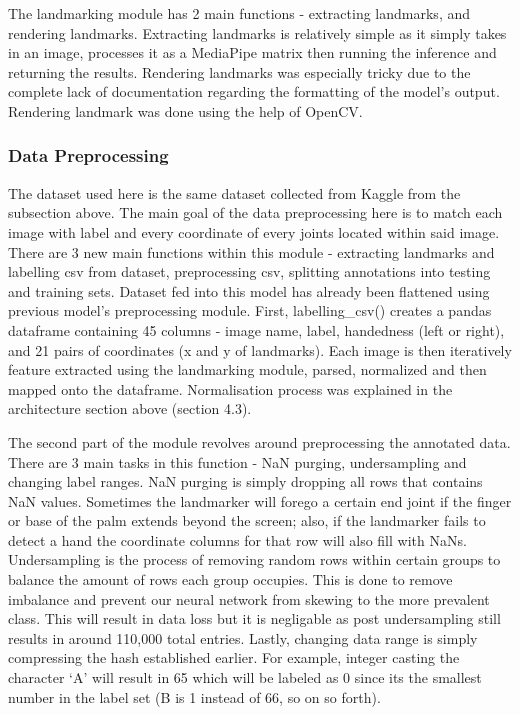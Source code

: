 \documentclass[11pt]{article}
\begin{document}
    The landmarking module has 2 main functions - extracting landmarks, and rendering landmarks. Extracting landmarks is relatively simple as it simply takes in an image, processes it as a MediaPipe matrix then running the inference and returning the results. Rendering landmarks was especially tricky due to the complete lack of documentation regarding the formatting of the model's output. Rendering landmark was done using the help of OpenCV.

        \subsubsection{Data Preprocessing}
    The dataset used here is the same dataset collected from Kaggle from the subsection above. The main goal of the data preprocessing here is to match each image with label and every coordinate of every joints located within said image. There are 3 new main functions within this module - extracting landmarks and labelling csv from dataset, preprocessing csv, splitting annotations into testing and training sets. Dataset fed into this model has already been flattened using previous model's preprocessing module. First, labelling\_csv() creates a pandas dataframe containing 45 columns - image name, label, handedness (left or right), and 21 pairs of coordinates (x and y of landmarks). Each image is then iteratively feature extracted using the landmarking module, parsed, normalized and then mapped onto the dataframe. Normalisation process was explained in the architecture section above (section 4.3). 
    
    The second part of the module revolves around preprocessing the annotated data. There are 3 main tasks in this function - NaN purging, undersampling and changing label ranges. NaN purging is simply dropping all rows that contains NaN values. Sometimes the landmarker will forego a certain end joint if the finger or base of the palm extends beyond the screen; also, if the landmarker fails to detect a hand the coordinate columns for that row will also fill with NaNs. Undersampling is the process of removing random rows within certain groups to balance the amount of rows each group occupies. This is done to remove imbalance and prevent our neural network from skewing to the more prevalent class. This will result in data loss but it is negligable as post undersampling still results in around 110,000 total entries. Lastly, changing data range is simply compressing the hash established earlier. For example, integer casting the character `A' will result in 65 which will be labeled as 0 since its the smallest number in the label set (B is 1 instead of 66, so on so forth).
\end{document}
